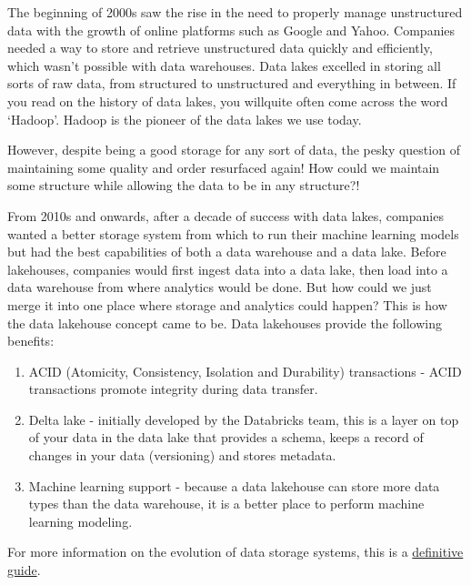 \documentclass[
]{book}
\begin{document}
The beginning of 2000s saw the rise in the need to properly manage unstructured data with the growth of online platforms such as Google and Yahoo. Companies needed a way to store and retrieve unstructured data quickly and efficiently, which wasn't possible with data warehouses. Data lakes excelled in storing all sorts of raw data, from structured to unstructured and everything in between. If you read on the history of data lakes, you willquite often come across the word `Hadoop'. Hadoop is the pioneer of the data lakes we use today.

However, despite being a good storage for any sort of data, the pesky question of maintaining some quality and order resurfaced again! How could we maintain some structure while allowing the data to be in any structure?!

From 2010s and onwards, after a decade of success with data lakes, companies wanted a better storage system from which to run their machine learning models but had the best capabilities of both a data warehouse and a data lake. Before lakehouses, companies would first ingest data into a data lake, then load into a data warehouse from where analytics would be done. But how could we just merge it into one place where storage and analytics could happen? This is how the data lakehouse concept came to be. Data lakehouses provide the following benefits:

\begin{enumerate}
\def\labelenumi{\arabic{enumi}.}
\item
  ACID (Atomicity, Consistency, Isolation and Durability) transactions - ACID transactions promote integrity during data transfer.
\item
  Delta lake - initially developed by the Databricks team, this is a layer on top of your data in the data lake that provides a schema, keeps a record of changes in your data (versioning) and stores metadata.
\item
  Machine learning support - because a data lakehouse can store more data types than the data warehouse, it is a better place to perform machine learning modeling.
\end{enumerate}

For more information on the evolution of data storage systems, this is a \href{https://www.databricks.com/blog/2021/05/19/evolution-to-the-data-lakehouse.html}{definitive guide}.
\end{document}
